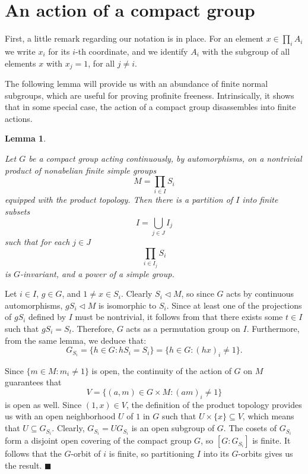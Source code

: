 \documentclass[12pt,a4paper]{article}
\newtheorem{lemma}[theorem]{Lemma}
\newenvironment{proof}[1][Proof]{\begin{trivlist}
\item[\hskip \labelsep {\bfseries #1}]}{\end{trivlist}}
\begin{document}
\section{An action of a compact group}

First, a little remark regarding our notation is in place. For an element $x \in \prod_i A_i$ we write $x_i$ for its $i$-th coordinate, and we identify $A_i$ with the subgroup of all elements $x$ with $x_j=1$, for all $j\neq i$. 

The following lemma will provide us with an abundance of finite normal subgroups, which are useful for proving profinite freeness. Intrinsically, it shows that in some special case, the action of a compact group disassembles into finite actions.

\begin{lemma} \label{CompactLem}

Let $G$ be a compact group acting continuously, by automorphisms, on a nontrivial product of nonabelian finite simple groups $$M = \prod_{i \in I}S_{i}$$ equipped with the product topology. Then there is a partition of $I$ into finite subsets $$I = \bigcup_{j \in J} I_{j}$$ such that for each $j \in J$ $$\prod_{i \in I_j}S_i$$ is $G$-invariant, and a power of a simple group.

\end{lemma}

\begin{proof}

Let $i \in I$, $g \in G$, and $1 \neq x \in S_i$. Clearly $S_i \lhd M$, so since $G$ acts by continuous automorphisms, $gS_i \lhd M$ is isomorphic to $S_i$. Since at least one of the projections of $gS_i$ defined by $I$ must be nontrivial, it follows from \cite[Lemma 8.2.4]{RZ} that there exists some $t \in I$ such that $gS_i = S_t$. Therefore, $G$ acts as a permutation group on $I$. Furthermore, from the same lemma, we deduce that:
$$G_{S_i} = \{h \in G : hS_i = S_i\} = \{h \in G : (hx)_i \neq 1\}.$$

Since $\{m \in M : m_i \neq 1\}$ is open, the continuity of the action of $G$ on $M$ guarantees that $$V = \{(a,m) \in G \times M : (am)_i \neq 1\}$$ is open as well. Since $(1,x) \in V$, the definition of the product topology provides us with an open neighborhood $U$ of $1$ in $G$ such that \mbox{$U \times \{x\} \subseteq V$}, which means that $U \subseteq G_{S_i}$. Clearly, $G_{S_i} = UG_{S_i}$ is an open subgroup of $G$. The cosets of $G_{S_i}$ form a disjoint open covering of the compact group $G$, so $[G : G_{S_i}]$ is finite. It follows that the $G$-orbit of $i$ is finite, so partitioning $I$ into its $G$-orbits gives us the result. $\blacksquare$

\end{proof}
\end{document}
